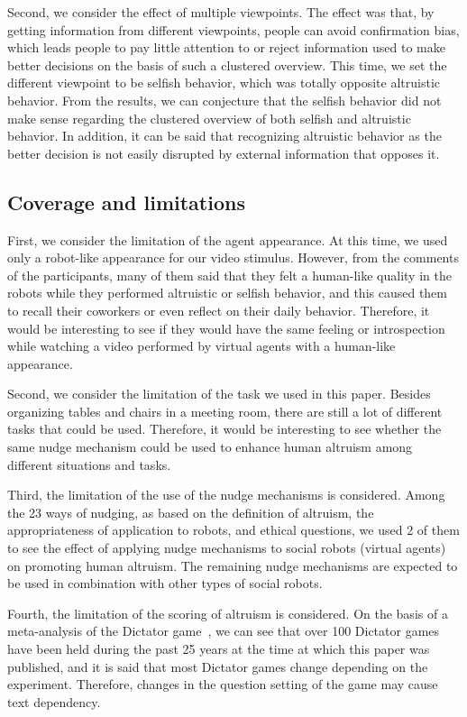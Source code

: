 \documentclass[runningheads]{llncs}
\begin{document}
Second, we consider the effect of multiple viewpoints. The effect was that, by getting information from different viewpoints, people can avoid confirmation bias, which leads people to pay little attention to or reject information used to make better decisions on the basis of such a clustered overview. This time, we set the different viewpoint to be selfish behavior, which was totally opposite altruistic behavior. From the results, we can conjecture that the selfish behavior did not make sense regarding the clustered overview of both selfish and altruistic behavior. In addition, it can be said that recognizing altruistic behavior as the better decision is not easily disrupted by external information that opposes it.



\subsection{Coverage and limitations}
First, we consider the limitation of the agent appearance. At this time, we used only a robot-like appearance for our video stimulus. However, from the comments of the participants, many of them said that they felt a human-like quality in the robots while they performed altruistic or selfish behavior, and this caused them to recall their coworkers or even reflect on their daily behavior. Therefore, it would be interesting to see if they would have the same feeling or introspection while watching a video performed by virtual agents with a human-like appearance. 

Second, we consider the limitation of the task we used in this paper. Besides organizing tables and chairs in a meeting room, there are still a lot of different tasks that could be used. Therefore, it would be interesting to see whether the same nudge mechanism could be used to enhance human altruism among different situations and tasks.

Third, the limitation of the use of the nudge mechanisms is considered. Among the 23 ways of nudging, as based on the definition of altruism, the appropriateness of application to robots, and ethical questions, we used 2 of them to see the effect of applying nudge mechanisms to social robots (virtual agents) on promoting human altruism. The remaining nudge mechanisms are expected to be used in combination with other types of social robots. 

Fourth, the limitation of the scoring of altruism is considered. On the basis of a meta-analysis of the Dictator game~\cite{ref_article36}, we can see that over 100 Dictator games have been held during the past 25 years at the time at which this paper was published, and it is said that most Dictator games change depending on the experiment. Therefore, changes in the question setting of the game may cause text dependency. 
\end{document}
